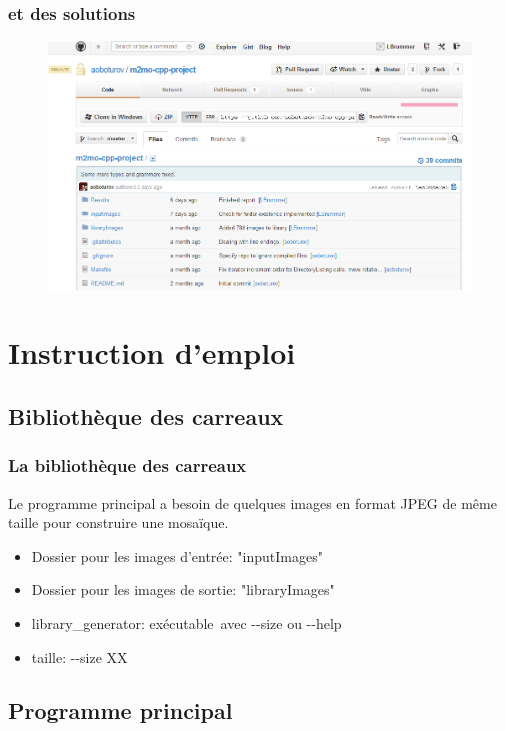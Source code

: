 \documentclass[handout]{beamer}
\newcommand{\tcb}{\color{blue}}
\begin{document}
\begin{frame}
\frametitle{\bf et des solutions}
\begin{figure}[H]
\includegraphics[scale=0.40]{GitHubCommits.png}
\end{figure}
\end{frame}

\section{Instruction d'emploi}
\subsection{Biblioth\`eque des carreaux}

\begin{frame}
\frametitle{\bf La biblioth\`eque des carreaux}
Le programme principal a besoin de quelques images en format JPEG de m\^eme taille pour construire une mosa\"{i}que.
\begin{itemize}
\item {\tcb Dossier pour les images d'entr\'ee}: "inputImages"
\item {\tcb Dossier pour les images de sortie}: "libraryImages"
\item {\tcb library\_generator}: ex\'ecutable\ avec {-}{-}size ou {-}{-}help

\item {\tcb taille}: {-}{-}size XX
\end{itemize}

\end{frame}

\subsection{Programme principal}
\end{document}
